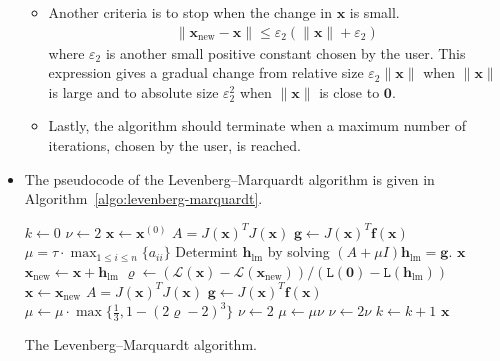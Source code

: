 \documentclass[10pt]{article}
\newcommand{\ve}[1]{\mathbf{#1}}
\newcommand{\mrm}[1]{\mathrm{#1}}
\newcommand{\mcal}[1]{\mathcal{#1}}
\begin{document}
\begin{itemize}
\begin{itemize}
        \item Another criteria is to stop when the change in $\ve{x}$ is small.
        \begin{align*}
            \| \ve{x}_{\mrm{new}} - \ve{x} \| \leq \varepsilon_2 (\| \ve{x}\| + \varepsilon_2)
        \end{align*}
        where $\varepsilon_2$ is another small positive constant chosen by the user. This expression gives a gradual change from relative size $\varepsilon_2 \| \ve{x}\|$ when $\| \ve{x}\|$ is large and to absolute size $\varepsilon_2^2$ when $\| \ve{x} \|$ is close to $\ve{0}$.

        \item Lastly, the algorithm should terminate when a maximum number of iterations, chosen by the user, is reached.
    \end{itemize}

    \item The pseudocode of the Levenberg--Marquardt algorithm is given in Algorithm~\ref{algo:levenberg-marquardt}.

    \begin{algorithm}[t]
        \begin{algorithmic}
            \State $k \gets 0$
            \State $\nu \gets 2$
            \State $\ve{x} \gets \ve{x}^{(0)}$
            \State $A = J(\ve{x})^T J(\ve{x})$
            \State $\ve{g} \gets J(\ve{x})^T \ve{f}(\ve{x})$
            \State $\mu = \tau \cdot \max_{1 \leq i \leq n} \{a_{ii}\}$
            \While {$\| \ve{g} \|_\infty > \varepsilon_1$ {\bf and} $k \leq k_{\max}$}
                \State Determint $\ve{h}_{\mrm{lm}}$ by solving $(A + \mu I)\ve{h}_{\mrm{lm}} = \ve{g}$.
                \If {$\| \ve{h}_{\mrm{lm}} \leq \varepsilon_2 (\| \ve{x}\| + \varepsilon_2)$}
                    \State \Return $\ve{x}$
                \EndIf
                \State $\ve{x}_{\mrm{new}} \gets \ve{x} + \ve{h}_{\mrm{lm}}$
                \State $\varrho \gets (\mcal{L}(\ve{x}) - \mcal{L}(\ve{x}_{\mrm{new}})) / (\mathtt{L}(\ve{0}) - \mathtt{L}(\ve{h}_{\mrm{lm}}))$
                    \State $\ve{x} \gets \ve{x}_{\mrm{new}}$
                    \State $A = J(\ve{x})^T J(\ve{x})$
                    \State $\ve{g} \gets J(\ve{x})^T \ve{f}(\ve{x})$
                    \State $\mu \gets \mu \cdot \max\{ \frac{1}{3}, 1 - (2\varrho -2)^3 \}$
                    \State $\nu \gets 2$
                \Else
                    \State $\mu \gets \mu \nu$
                    \State $\nu \gets 2\nu$
                \EndIf
                \State $k \gets k+1$
            \EndWhile
            \State \Return $\ve{x}$
        \end{algorithmic}
        \caption{The Levenberg--Marquardt algorithm.}
        \label{algo:levenberg-marquardt}
    \end{algorithm}
\end{itemize}




\end{document}
